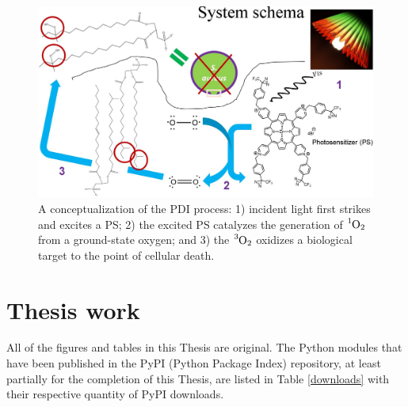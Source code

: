 \begin{figure}
    \centering
    \includegraphics[width = \textwidth]{images/Introduction/PDI_workflow.png}
    \caption{
        A conceptualization of the PDI process: 1) incident light first strikes and excites a PS; 2) the excited PS catalyzes the generation of $\ce{^1O_2}$ from a ground-state oxygen; and 3) the $\ce{^3O_2}$ oxidizes a biological target to the point of cellular death.   
    }
    \label{PDI_workflow}
\end{figure}

\section{Thesis work}
All of the figures and tables in this Thesis are original. The Python modules that have been published in the PyPI (Python Package Index) repository, at least partially for the completion of this Thesis, are listed in Table \ref{downloads} with their respective quantity of PyPI downloads.

